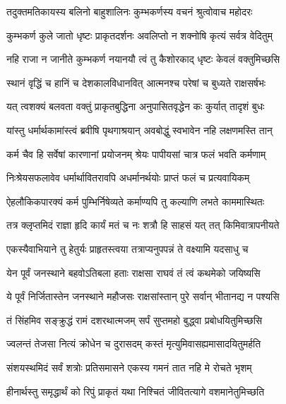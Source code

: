 
\twolineshloka
{तदुक्तमतिकायस्य बलिनो बाहुशालिनः}
{कुम्भकर्णस्य वचनं श्रुत्वोवाच महोदरः} %

\twolineshloka
{कुम्भकर्ण कुले जातो धृष्टः प्राकृतदर्शनः}
{अवलिप्तो न शक्नोषि कृत्यं सर्वत्र वेदितुम्} %

\twolineshloka
{नहि राजा न जानीते कुम्भकर्ण नयानयौ}
{त्वं तु कैशोरकाद् धृष्टः केवलं वक्तुमिच्छसि} %

\twolineshloka
{स्थानं वृद्धिं च हानिं च देशकालविधानवित्}
{आत्मनश्च परेषां च बुध्यते राक्षसर्षभः} %

\twolineshloka
{यत् त्वशक्यं बलवता वक्तुं प्राकृतबुद्धिना}
{अनुपासितवृद्धेन कः कुर्यात् तादृशं बुधः} %

\twolineshloka
{यांस्तु धर्मार्थकामांस्त्वं ब्रवीषि पृथगाश्रयान्}
{अवबोद्धुं स्वभावेन नहि लक्षणमस्ति तान्} %

\twolineshloka
{कर्म चैव हि सर्वेषां कारणानां प्रयोजनम्}
{श्रेयः पापीयसां चात्र फलं भवति कर्मणाम्} %

\twolineshloka
{निःश्रेयसफलावेव धर्मार्थावितरावपि}
{अधर्मानर्थयोः प्राप्तं फलं च प्रत्यवायिकम्} %

\twolineshloka
{ऐहलौकिकपारक्यं कर्म पुम्भिर्निषेव्यते}
{कर्माण्यपि तु कल्याणि लभते काममास्थितः} %

\twolineshloka
{तत्र क्लृप्तमिदं राज्ञा हृदि कार्यं मतं च नः}
{शत्रौ हि साहसं यत् तत् किमिवात्रापनीयते} %

\twolineshloka
{एकस्यैवाभियाने तु हेतुर्यः प्राहृतस्त्वया}
{तत्राप्यनुपपन्नं ते वक्ष्यामि यदसाधु च} %

\twolineshloka
{येन पूर्वं जनस्थाने बहवोऽतिबला हताः}
{राक्षसा राघवं तं त्वं कथमेको जयिष्यसि} %

\twolineshloka
{ये पूर्वं निर्जितास्तेन जनस्थाने महौजसः}
{राक्षसांस्तान् पुरे सर्वान् भीतानद्य न पश्यसि} %

\twolineshloka
{तं सिंहमिव सङ्क्रुद्धं रामं दशरथात्मजम्}
{सर्पं सुप्तमहो बुद्ध्वा प्रबोधयितुमिच्छसि} %

\twolineshloka
{ज्वलन्तं तेजसा नित्यं क्रोधेन च दुरासदम्}
{कस्तं मृत्युमिवासह्यमासादयितुमर्हति} %

\twolineshloka
{संशयस्थमिदं सर्वं शत्रोः प्रतिसमासने}
{एकस्य गमनं तात नहि मे रोचते भृशम्} %

\twolineshloka
{हीनार्थस्तु समृद्धार्थं को रिपुं प्राकृतं यथा}
{निश्चितं जीवितत्यागे वशमानेतुमिच्छति} %

